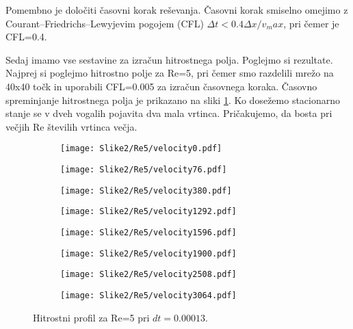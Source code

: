 \documentclass[12pt,a4paper]{article}
\begin{document}
Pomembno je določiti časovni korak reševanja. Časovni korak smiselno omejimo z Courant–Friedrichs–Lewyjevim pogojem (CFL) $\Delta t < 0.4 \Delta x /v_max$, pri čemer je CFL=0.4.

Sedaj imamo vse sestavine za izračun hitrostnega polja. Poglejmo si rezultate. Najprej si poglejmo hitrostno polje za Re=5, pri čemer smo razdelili mrežo na 40x40 točk in uporabili CFL=0.005 za izračun časovnega koraka. Časovno spreminjanje hitrostnega polja je prikazano na sliki \ref{fig:slika2}. Ko dosežemo stacionarno stanje se v dveh vogalih pojavita dva mala vrtinca. Pričakujemo, da bosta pri večjih Re številih vrtinca večja.

\begin{figure}[H]
    \centering
    \begin{subfigure}[b]{0.2\textwidth}  			
        \texttt{[image: Slike2/Re5/velocity0.pdf]}
    \end{subfigure}
    \begin{subfigure}[b]{0.2\textwidth}  			
        \texttt{[image: Slike2/Re5/velocity76.pdf]}
    \end{subfigure}
    \begin{subfigure}[b]{0.2\textwidth}  			
        \texttt{[image: Slike2/Re5/velocity380.pdf]}
    \end{subfigure}
        \begin{subfigure}[b]{0.2\textwidth}  			
        \texttt{[image: Slike2/Re5/velocity1292.pdf]}
    \end{subfigure}
 
     \begin{subfigure}[b]{0.2\textwidth}  			
        \texttt{[image: Slike2/Re5/velocity1596.pdf]}
    \end{subfigure}
        \begin{subfigure}[b]{0.2\textwidth}  			
        \texttt{[image: Slike2/Re5/velocity1900.pdf]}
    \end{subfigure}
        \begin{subfigure}[b]{0.2\textwidth}  			
        \texttt{[image: Slike2/Re5/velocity2508.pdf]}
    \end{subfigure}
        \begin{subfigure}[b]{0.2\textwidth}  			
        \texttt{[image: Slike2/Re5/velocity3064.pdf]}
    \end{subfigure}
    \caption{Hitrostni profil za Re=5 pri $dt=0.00013$.} \label{fig:slika2}
\end{figure}
\end{document}
